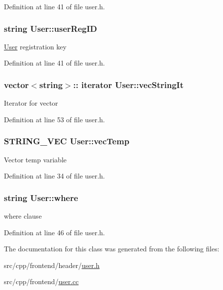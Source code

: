 Definition at line 41 of file user.\-h.

\hypertarget{classUser_a2e4c2abea5d64bf9bfcd1c73b227a6b8}{
\subsubsection[{user\-Reg\-I\-D}]{\setlength{\rightskip}{0pt plus 5cm}string User\-::user\-Reg\-I\-D\hspace{0.3cm}{\ttfamily [protected]}}}\label{classUser_a2e4c2abea5d64bf9bfcd1c73b227a6b8}
\hyperlink{classUser}{User} registration key 

Definition at line 41 of file user.\-h.

\hypertarget{classUser_a1bef92bf2e92dc13d4c3a9fb03582d3f}{
\subsubsection[{vec\-String\-It}]{\setlength{\rightskip}{0pt plus 5cm}vector$<$string$>$\-:: iterator User\-::vec\-String\-It\hspace{0.3cm}{\ttfamily [protected]}}}\label{classUser_a1bef92bf2e92dc13d4c3a9fb03582d3f}
Iterator for vector 

Definition at line 53 of file user.\-h.

\hypertarget{classUser_addb446e2ea86d984e243909311967052}{
\subsubsection[{vec\-Temp}]{\setlength{\rightskip}{0pt plus 5cm}S\-T\-R\-I\-N\-G\-\_\-\-V\-E\-C User\-::vec\-Temp\hspace{0.3cm}{\ttfamily [protected]}}}\label{classUser_addb446e2ea86d984e243909311967052}
Vector temp variable 

Definition at line 34 of file user.\-h.

\hypertarget{classUser_aaa4322929700c09aad2594331d3c2071}{
\subsubsection[{where}]{\setlength{\rightskip}{0pt plus 5cm}string User\-::where\hspace{0.3cm}{\ttfamily [protected]}}}\label{classUser_aaa4322929700c09aad2594331d3c2071}
where clause 

Definition at line 46 of file user.\-h.



The documentation for this class was generated from the following files\-:\begin{DoxyCompactItemize}
\item 
src/cpp/frontend/header/\hyperlink{user_8h}{user.\-h}\item 
src/cpp/frontend/\hyperlink{user_8cc}{user.\-cc}\end{DoxyCompactItemize}
